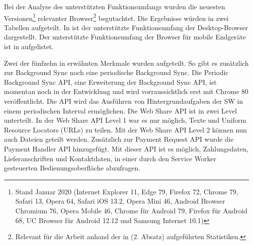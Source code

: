 Bei der Analyse des unterstützten Funktionsumfangs wurden die neuesten Versionen\footnote{Stand Januar 2020 (Internet Explorer 11, Edge 79, Firefox 72, Chrome 79, Safari 13, Opera 64, Safari iOS 13.2, Opera Mini 46, Android Browser Chromium 76, Opera Mobile 46, Chrome für Android 79, Firefox für Android 68, UC Browser für Android 12.12 und Samsung Internet 10.1) }
relevanter Browser\footnote{Relevant für die Arbeit anhand der in  (2. Absatz) aufgeführten Statistiken.}
begutachtet. Die Ergebnisse würden in zwei Tabellen aufgeteilt. In 
ist der unterstützte Funktionsumfang der Desktop-Browser dargestellt. Der unterstützte Funktionsumfang der Browser
für mobile Endgeräte ist in  aufgelistet.

Zwei der fünfzehn in  erwähnten Merkmale wurden aufgeteilt.
So gibt es zusätzlich zur Background Sync noch eine
periodische Background Sync. Die Periodic Background Sync API, eine Erweiterung der Background
Sync API, ist momentan noch in der Entwicklung und wird vorraussichtlich erst mit
Chrome 80 veröffentlicht. Die API wird das Ausführen von Hintergrundaufgaben der SW
in einem periodischen Interval ermöglichen.\cite{ChromeStatusPeriodicBackgroundSync}
Die Web Share API ist in zwei Level unterteilt. In der Web Share API Level 1 war es
nur möglich, Texte und Uniform Resource Locators (URLs) zu teilen. Mit der Web Share
API Level 2 können nun auch Dateien geteilt werden.\cite{WebShareAPITwoChromeStatus}
Zusätzlich zur Payment Request API wurde die Payment Handler API hinzugefügt. Mit dieser
API ist es möglich, Zahlungsdaten, Lieferanschriften und Kontaktdaten, in einer durch
den Service Worker gesteuerten Bedienungsoberfläche abzufragen.\cite{PaymentHandlerAPIGoogleDev}

